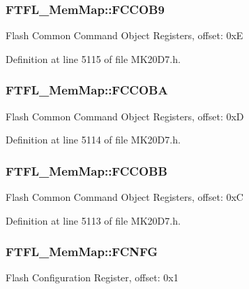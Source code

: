\subsubsection[{\texorpdfstring{F\+C\+C\+O\+B9}{FCCOB9}}]{ F\+T\+F\+L\+\_\+\+Mem\+Map\+::\+F\+C\+C\+O\+B9}\hypertarget{struct_f_t_f_l___mem_map_a83df0171b968c6b8dcbb6744d59ff846}{}\label{struct_f_t_f_l___mem_map_a83df0171b968c6b8dcbb6744d59ff846}
Flash Common Command Object Registers, offset\+: 0xE 

Definition at line 5115 of file M\+K20\+D7.\+h.

\subsubsection[{\texorpdfstring{F\+C\+C\+O\+BA}{FCCOBA}}]{ F\+T\+F\+L\+\_\+\+Mem\+Map\+::\+F\+C\+C\+O\+BA}\hypertarget{struct_f_t_f_l___mem_map_ab5bff1892ab8904526e339e3026c00e4}{}\label{struct_f_t_f_l___mem_map_ab5bff1892ab8904526e339e3026c00e4}
Flash Common Command Object Registers, offset\+: 0xD 

Definition at line 5114 of file M\+K20\+D7.\+h.

\subsubsection[{\texorpdfstring{F\+C\+C\+O\+BB}{FCCOBB}}]{ F\+T\+F\+L\+\_\+\+Mem\+Map\+::\+F\+C\+C\+O\+BB}\hypertarget{struct_f_t_f_l___mem_map_ac4ab6a6e6a52eabd8192d9dd7a85c3d6}{}\label{struct_f_t_f_l___mem_map_ac4ab6a6e6a52eabd8192d9dd7a85c3d6}
Flash Common Command Object Registers, offset\+: 0xC 

Definition at line 5113 of file M\+K20\+D7.\+h.

\subsubsection[{\texorpdfstring{F\+C\+N\+FG}{FCNFG}}]{ F\+T\+F\+L\+\_\+\+Mem\+Map\+::\+F\+C\+N\+FG}\hypertarget{struct_f_t_f_l___mem_map_ae9a67c8547adc56fdcee67ba6e8bf50d}{}\label{struct_f_t_f_l___mem_map_ae9a67c8547adc56fdcee67ba6e8bf50d}
Flash Configuration Register, offset\+: 0x1 

